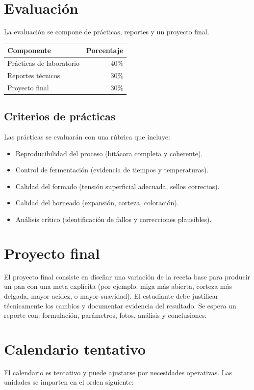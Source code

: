 \documentclass[
  coursetitle={Cómputo Nube y Tecnologías Emergentes},
  coursehours={96},
  coursedate={Verano 2026},
  doctype={Guía del curso},
  otherlangs={english,french},
  authorname={Lázaro},
  authorsurname={Bustio-Martínez},
  authortitle={PhD},
  role={Profesor Investigador},
  email={lbustio@inaoe.mx},
  phone={5559504000},
  ext={7459},
  institution={Instituto Nacional de Astrofísica, Óptica y Electrónica (INAOE)},
  department={Maestría en Ciencias en Tecnologías de Seguridad},
  address={Luis Enrique Erro 1, Sta. Ma. Tonantzintla, San Andrés Cholula, CP 72840, Puebla, México},
  margin={0.5in}
]{lbustio_lecture_notes}
\begin{document}
\section{Evaluación}
La evaluación se compone de prácticas, reportes y un proyecto final.

\begin{center}
\begin{tabular}{l r}
\hline
Componente & Porcentaje \\
\hline
Prácticas de laboratorio & 40\% \\
Reportes técnicos & 30\% \\
Proyecto final & 30\% \\
\hline
\end{tabular}
\end{center}

\subsection{Criterios de prácticas}
Las prácticas se evaluarán con una rúbrica que incluye:
\begin{itemize}
  \item Reproducibilidad del proceso (bitácora completa y coherente).
  \item Control de fermentación (evidencia de tiempos y temperaturas).
  \item Calidad del formado (tensión superficial adecuada, sellos correctos).
  \item Calidad del horneado (expansión, corteza, coloración).
  \item Análisis crítico (identificación de fallos y correcciones plausibles).
\end{itemize}

\section{Proyecto final}
El proyecto final consiste en diseñar una variación de la receta base para producir un pan con una meta
explícita (por ejemplo: miga más abierta, corteza más delgada, mayor acidez, o mayor suavidad). El estudiante
debe justificar técnicamente los cambios y documentar evidencia del resultado. Se espera un reporte con:
formulación, parámetros, fotos, análisis y conclusiones.

\newpage

\section{Calendario tentativo}
El calendario es tentativo y puede ajustarse por necesidades operativas. Las unidades se imparten en el
orden siguiente:
\end{document}
